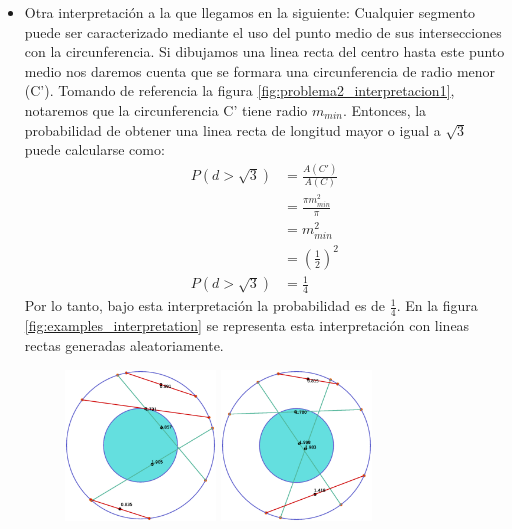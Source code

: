 \begin{itemize}
\begin{figure}[H]
              \caption{}
              \label{fig:problema2_interpretacion2}
          \end{figure}
\end{itemize}
\begin{itemize}
    \item Otra interpretación a la que llegamos en la siguiente: Cualquier segmento puede ser caracterizado mediante el uso del punto medio de sus intersecciones con la circunferencia. Si dibujamos una linea recta del centro hasta este punto medio nos daremos cuenta que se formara una circunferencia de radio menor (C'). Tomando de referencia la figura \ref{fig:problema2_interpretacion1}, notaremos que la circunferencia C' tiene radio $m_{min}$. Entonces, la probabilidad de obtener una linea recta de longitud mayor o igual a $\sqrt{3}$ puede calcularse como:
          \begin{align*}
              P(d>\sqrt{3}) & = \frac{A(C')}{A(C)}         \\
                            & = \frac{\pi m_{min}^2}{\pi}  \\
                            & = m_{min}^2                  \\
                            & = \left(\frac{1}{2}\right)^2 \\
              P(d>\sqrt{3}) & = \frac{1}{4}
          \end{align*}
          Por lo tanto, bajo esta interpretación la probabilidad es de  $\frac{1}{4}$. En la figura \ref{fig:examples_interpretation} se representa esta interpretación con lineas rectas generadas aleatoriamente.
          \begin{figure}[H]
              \centering
              \includegraphics[width=4cm]{Graphics/circle_3_1.eps}
              \includegraphics[width=4cm]{Graphics/circle_3_2.eps}

\end{figure}
\end{itemize}
